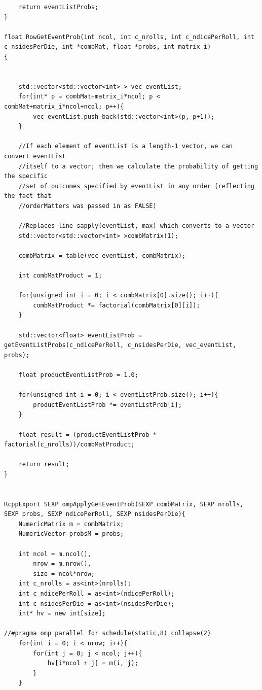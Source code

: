 \documentclass[12pt]{article}
\begin{document}
\begin{lstlisting}
    return eventListProbs;
}

float RowGetEventProb(int ncol, int c_nrolls, int c_ndicePerRoll, int c_nsidesPerDie, int *combMat, float *probs, int matrix_i)
{


    std::vector<std::vector<int> > vec_eventList;
    for(int* p = combMat+matrix_i*ncol; p < combMat+matrix_i*ncol+ncol; p++){
        vec_eventList.push_back(std::vector<int>(p, p+1));
    }
        
    //If each element of eventList is a length-1 vector, we can convert eventList
    //itself to a vector; then we calculate the probability of getting the specific
    //set of outcomes specified by eventList in any order (reflecting the fact that
    //orderMatters was passed in as FALSE)

    //Replaces line sapply(eventList, max) which converts to a vector
    std::vector<std::vector<int> >combMatrix(1);

    combMatrix = table(vec_eventList, combMatrix);

    int combMatProduct = 1;

    for(unsigned int i = 0; i < combMatrix[0].size(); i++){
        combMatProduct *= factorial(combMatrix[0][i]);
    }

    std::vector<float> eventListProb = getEventListProbs(c_ndicePerRoll, c_nsidesPerDie, vec_eventList, probs);

    float productEventListProb = 1.0;

    for(unsigned int i = 0; i < eventListProb.size(); i++){
        productEventListProb *= eventListProb[i];
    }
    
    float result = (productEventListProb * factorial(c_nrolls))/combMatProduct;

    return result;
}


RcppExport SEXP ompApplyGetEventProb(SEXP combMatrix, SEXP nrolls, SEXP probs, SEXP ndicePerRoll, SEXP nsidesPerDie){
    NumericMatrix m = combMatrix;
    NumericVector probsM = probs;

    int ncol = m.ncol(),
        nrow = m.nrow(),
        size = ncol*nrow;
    int c_nrolls = as<int>(nrolls);
    int c_ndicePerRoll = as<int>(ndicePerRoll);
    int c_nsidesPerDie = as<int>(nsidesPerDie);
    int* hv = new int[size];

//#pragma omp parallel for schedule(static,8) collapse(2)
    for(int i = 0; i < nrow; i++){
        for(int j = 0; j < ncol; j++){
            hv[i*ncol + j] = m(i, j);
        }
    }


\end{lstlisting}
\end{document}
